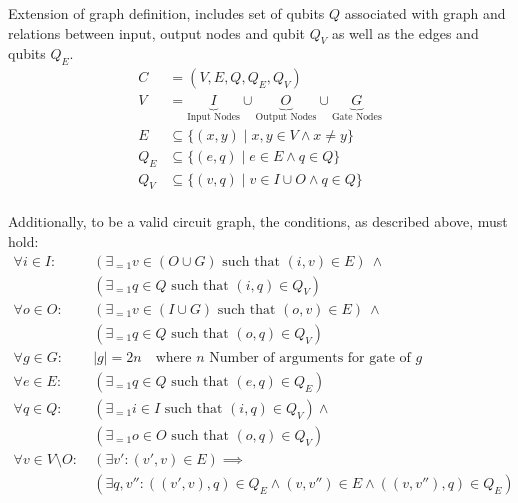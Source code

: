 Extension of graph definition, includes set of qubits $Q$ associated with graph and relations between input, output nodes and qubit $Q_V$ as well as the edges and qubits $Q_E$. 
\begin{align*}
    C &= (V, E, Q, Q_E, Q_V)\\
    V &= \underbrace{I}_{\text{Input Nodes}} \cup \underbrace{O}_{\text{Output Nodes}} \cup \underbrace{G}_{\text{Gate Nodes}}\\
    E &\subseteq \{ (x, y) \mid x,y \in V \land x \neq y \}\\
    Q_E &\subseteq \{ (e, q) \mid e \in E \land q \in Q \}\\
    Q_V &\subseteq \{ (v, q) \mid v \in I \cup O \land q \in Q \}\\
\end{align*}

Additionally, to be a valid circuit graph, the conditions, as described above, must hold:
\begin{align*}
    \forall i \in I :\ & (\exists_{=1} v \in (O \cup G) \text{ such that } (i, v) \in E ) \ \land\\
                       & (\exists_{=1} q \in Q \text{ such that } (i, q) \in Q_V) \\
    \forall o \in O :\ & (\exists_{=1} v \in (I \cup G) \text{ such that } (o, v) \in E) \ \land\\
                       & (\exists_{=1} q \in Q \text{ such that } (o, q) \in Q_V) \\
    \forall g \in G :\ & |g| = 2n \quad \text{where } n \text{ Number of arguments for gate of } g\\
    \forall e \in E :\ & (\exists_{=1} q \in Q \text{ such that } (e, q) \in Q_E)\\
    \forall q \in Q :\ & (\exists_{=1} i \in I \text{ such that } (i, q) \in Q_V) \land\\
                       & (\exists_{=1} o \in O \text{ such that } (o, q) \in Q_V) \\
    \forall v \in V \setminus O :\ & (\exists v': (v', v) \in E) \implies\\
                                   & (\exists q, v'' : ((v', v), q) \in Q_E \land (v, v'') \in E \land ((v, v''), q) \in Q_E)
\end{align*}

